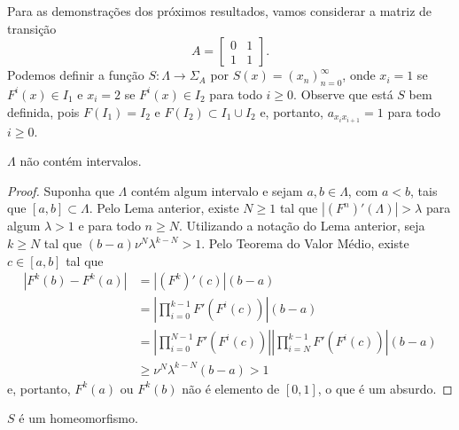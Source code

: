 Para as demonstrações dos próximos resultados, vamos considerar a matriz de transição
$$A = \begin{bmatrix}
0 & 1 \\
1 & 1
\end{bmatrix}.$$
Podemos definir a função $S: \Lambda \to \Sigma_A$ por $S(x) = (x_n)_{n=0}^\infty$, onde $x_i = 1$ se $F^i(x) \in I_1$ e $x_i = 2$ se $F^i(x) \in I_2$ para todo $i \geq 0$. Observe que está $S$ bem definida, pois $F(I_1) = I_2$ e $F(I_2) \subset I_1 \cup I_2$ e, portanto, $a_{x_i x_{i+1}} = 1$ para todo $i \geq 0$. 

\begin{lemma}
$\Lambda$ não contém intervalos.
\end{lemma}

\begin{proof}
Suponha que $\Lambda$ contém algum intervalo e sejam $a, b \in \Lambda$, com $a < b$, tais que $[a, b] \subset \Lambda$. Pelo Lema anterior, existe $N \geq 1$ tal que $|(F^n)'(\Lambda)| > \lambda$ para algum $\lambda > 1$ e para todo $n \geq N$. Utilizando a notação do Lema anterior, seja $k \geq N$ tal que $(b - a) \nu^N \lambda^{k - N} > 1$. Pelo Teorema do Valor Médio, existe $c \in [a, b]$ tal que
\begin{align*}
|F^k(b) - F^k(a)| & = |(F^k)'(c)|(b-a) \\
& = \left| \prod_{i=0}^{k-1} F'(F^i(c)) \right| (b-a) \\ 
& = \left| \prod_{i=0}^{N-1} F'(F^i(c)) \right| \left| \prod_{i=N}^{k-1} F'(F^i(c)) \right| (b-a) \\
& \geq \nu^N \lambda^{k-N} (b-a) > 1
\end{align*}
e, portanto, $F^k(a)$ ou $F^k(b)$ não é elemento de $[0,1]$, o que é um absurdo.
\end{proof}

\begin{proposition}
$S$ é um homeomorfismo.
\end{proposition}


